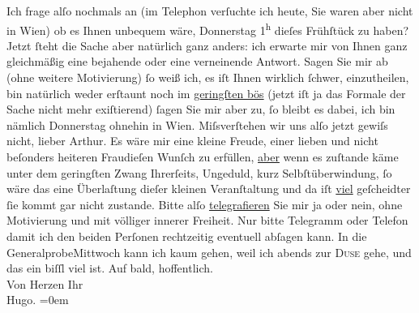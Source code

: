 \begin{ledgroupsized}[t]{13cm}
           \pstart
           Ich frage alſo nochmals an (im Telephon verſuchte ich heute, Sie waren aber nicht in
                  Wien) ob es Ihnen unbequem wäre,
                  Donnerstag{ }1\textsuperscript{h} dieſes Frühſtück zu haben? Jetzt ſteht die Sache aber
                  {\pb}natürlich ganz anders: ich
               erwarte mir von Ihnen ganz gleichmäßig eine bejahende oder eine verneinende Antwort.
               Sagen Sie mir ab (ohne weitere Motivierung) ſo weiß ich, es iſt Ihnen wirklich
               ſchwer, einzutheilen, bin natürlich weder erſtaunt noch im \uline{geringſten bös} (jetzt iſt ja das Formale der Sache nicht mehr exiſtierend)
                  {\pb}ſagen Sie mir aber zu, ſo
               bleibt es dabei, ich bin nämlich Donnerstag ohnehin in Wien.\pend
           \pstart
           Miſsverſtehen wir uns alſo jetzt gewiſs nicht, lieber Arthur.\pend
           \pstart
           Es wäre mir eine kleine Freude, einer lieben und nicht beſonders heiteren Fraudieſen Wunſch zu erfüllen, \uline{aber} wenn es zuſtande käme unter dem geringſten Zwang
               Ihrerſeits, Ungeduld, kurz Selbſtüberwindung, ſo wäre das eine Überlaſtung dieſer
               kleinen Veranſtaltung und da iſt \uline{viel} geſcheidter {\pb}ſie kommt gar nicht zustande.\pend
           \pstart
           Bitte alſo \uline{telegrafieren} Sie mir ja oder nein, ohne
               Motivierung und mit völliger innerer Freiheit.\pend
           \pstart
           Nur bitte Telegramm oder Telefon damit ich den beiden Perſonen rechtzeitig eventuell {\pb}abſagen kann.\pend
           \pstart
           In die GeneralprobeMittwoch kann ich kaum gehen, weil ich abends zur \textsc{Duse} gehe, und das ein biſſl viel ist.\pend
           \pstart
           Auf bald, hoffentlich.{\\[\baselineskip]}Von Herzen Ihr{\\[\baselineskip]}\spacefill\mbox{Hugo.}\pend
           \leftskip=0em{}\endnumbering{}\end{ledgroupsized}  \newcommand{\dateiname}{L01213}\newcommand{\titel}{Hugo von Hofmannsthal an Arthur Schnitzler, [30. 3. 1902]}\newcommand{\editorInnen}{Martin Anton Müller und Gerd-Hermann Susen}
      